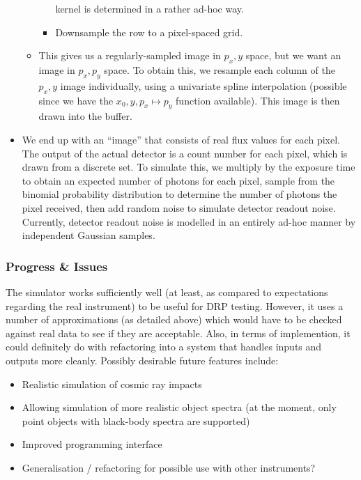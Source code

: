 \begin{itemize}
\begin{itemize}
\begin{itemize}
kernel is determined in a rather ad-hoc way.
%
\item Downsample the row to a pixel-spaced grid.
\end{itemize}
%
\item This gives us a regularly-sampled image in $p_x, y$ space, but we want an image
in $p_x, p_y$ space. To obtain this, we resample each column of the $p_x, y$ image
individually, using a univariate spline interpolation (possible since we have the
$x_0, y, p_x \mapsto p_y$ function available). This image is then drawn into the buffer.
\end{itemize}
%
\item We end up with an ``image'' that consists of real flux values for
each pixel. The output of the actual detector is a count number for each
pixel, which is drawn from a discrete set. To simulate this, we multiply
by the exposure time to obtain an expected number of photons for each
pixel, sample from the binomial probability distribution to determine
the number of photons the pixel received, then add random noise to simulate
detector readout noise. Currently, detector readout noise is modelled in an
entirely ad-hoc manner by independent Gaussian samples.

\end{itemize}
%

\subsubsection{Progress \& Issues}

The simulator works sufficiently well (at least, as compared to
expectations regarding the real instrument) to be useful for DRP
testing. However, it uses a number of approximations (as detailed above)
which would have to be checked against real data to see if they are
acceptable. Also, in terms of implemention, it could definitely do with
refactoring into a system that handles inputs and outputs more cleanly.
Possibly desirable future features include:
\begin{itemize}
\item Realistic simulation of cosmic ray impacts
\item Allowing simulation of more realistic object spectra (at the moment,
only point objects with black-body spectra are supported)
\item Improved programming interface
\item Generalisation / refactoring for possible use with other instruments?
\end{itemize}

